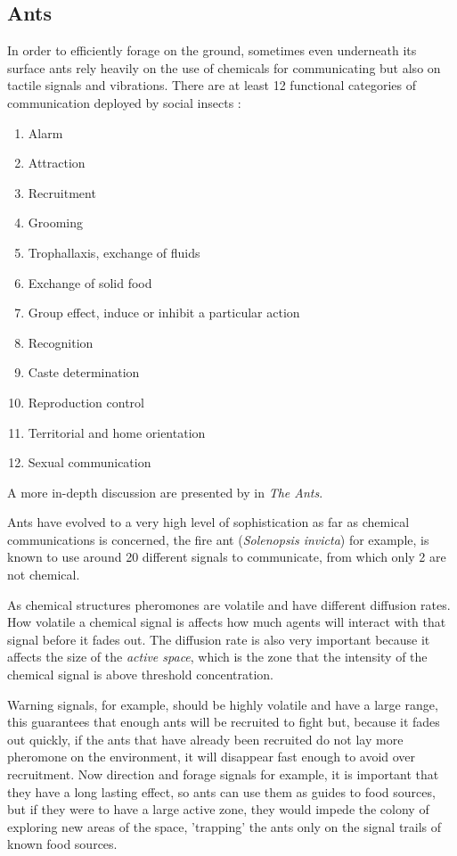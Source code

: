 \subsection{Ants}

In order to efficiently forage on the ground, sometimes even underneath its surface ants rely heavily on the use of chemicals for communicating but also on tactile signals and vibrations. \cite{holldobler1999} There are at least 12 functional categories of communication deployed by social insects \cite{citeulike:3731267}:

\begin{enumerate}
  \item Alarm
  \item Attraction
  \item Recruitment
  \item Grooming
  \item Trophallaxis, exchange of fluids
  \item Exchange of solid food
  \item Group effect, induce or inhibit a particular action
  \item Recognition
  \item Caste determination
  \item Reproduction control
  \item Territorial and home orientation
  \item Sexual communication
\end{enumerate}

A more in-depth discussion are presented by \citeauthor{holldobler1990} in \emph{The Ants}.

Ants have evolved to a very high level of sophistication as far as chemical communications is concerned, the fire ant (\emph{Solenopsis invicta}) for example, is known to use around 20 different signals to communicate, from which only 2 are not chemical. \cite{citeulike:3731267} \cite{tschinkel2006fire}

As chemical structures pheromones are volatile and have different diffusion rates. How volatile a chemical signal is affects how much agents will interact with that signal before it fades out. The diffusion rate is also very important because it affects the size of the \emph{active space}, which is the zone that the intensity of the chemical signal is above threshold concentration. \cite{citeulike:3731267} 

Warning signals, for example, should be highly volatile and have a large range, this guarantees that enough ants will be recruited to fight but, because it fades out quickly, if the ants that have already been recruited do not lay more pheromone on the environment, it will disappear fast enough to avoid over recruitment. Now direction and forage signals for example, it is important that they have a long lasting effect, so ants can use them as guides to food sources, but if they were to have a large active zone, they would impede the colony of exploring new areas of the space, 'trapping' the ants only on the signal trails of known food sources.

